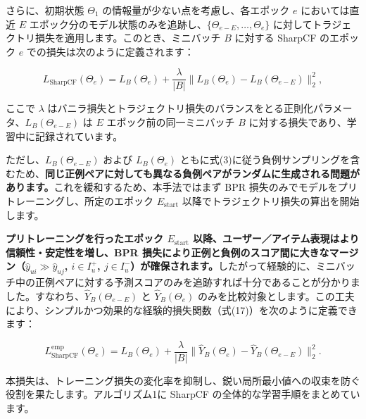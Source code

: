 \documentclass[11pt,a4paper]{article}
\begin{document}
さらに、初期状態 $\Theta_1$ の情報量が少ない点を考慮し、各エポック $e$ においては直近 $E$ エポック分のモデル状態のみを追跡し、$\{\Theta_{e-E}, \ldots, \Theta_e\}$ に対してトラジェクトリ損失を適用します。このとき、ミニバッチ $B$ に対する SharpCF のエポック $e$ での損失は次のように定義されます：

\begin{equation}
L_{\text{SharpCF}}(\Theta_e) = L_B(\Theta_e) + \frac{\lambda}{|B|} \|L_B(\Theta_e) - L_B(\Theta_{e-E})\|_2^2,
\end{equation}

ここで $\lambda$ はバニラ損失とトラジェクトリ損失のバランスをとる正則化パラメータ、$L_B(\Theta_{e-E})$ は $E$ エポック前の同一ミニバッチ $B$ に対する損失であり、学習中に記録されています。

ただし、$L_B(\Theta_{e-E})$ および $L_B(\Theta_e)$ ともに式(3)に従う負例サンプリングを含むため、\textbf{同じ正例ペアに対しても異なる負例ペアがランダムに生成される問題があります。}これを緩和するため、本手法ではまず BPR 損失のみでモデルをプリトレーニングし、所定のエポック $E_{\text{start}}$ 以降でトラジェクトリ損失の算出を開始します。

\textbf{プリトレーニングを行ったエポック $E_{\text{start}}$ 以降、ユーザー／アイテム表現はより信頼性・安定性を増し、BPR 損失により正例と負例のスコア間に大きなマージン（$\hat{y}_{ui} \gg \hat{y}_{uj}$, $i \in I_u^+$, $j \in I_u^-$）が確保されます。}したがって経験的に、ミニバッチ中の正例ペアに対する予測スコアのみを追跡すれば十分であることが分かりました。すなわち、$\hat{Y}_B(\Theta_{e-E})$ と $\hat{Y}_B(\Theta_e)$ のみを比較対象とします。この工夫により、シンプルかつ効果的な経験的損失関数（式(17)）を次のように定義できます：

\begin{equation}
L_{\text{SharpCF}}^{\text{emp}}(\Theta_e) = L_B(\Theta_e) + \frac{\lambda}{|B|} \|\hat{Y}_B(\Theta_e) - \hat{Y}_B(\Theta_{e-E})\|_2^2.
\end{equation}

本損失は、トレーニング損失の変化率を抑制し、鋭い局所最小値への収束を防ぐ役割を果たします。アルゴリズム1に SharpCF の全体的な学習手順をまとめています。
\end{document}
